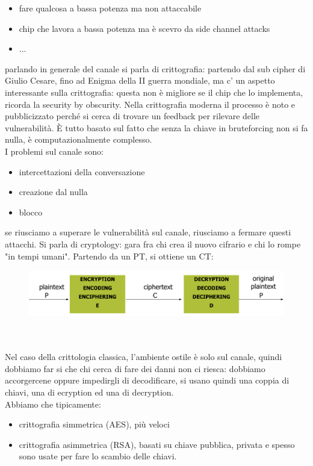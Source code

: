 \documentclass[oneside, 12pt]{extbook}
\begin{document}
\begin{itemize}
	\item fare qualcosa a bassa potenza ma non attaccabile
	\item chip che lavora a bassa potenza ma è scevro da side channel attacks
	\item ...
\end{itemize}
parlando in generale del canale si parla di crittografia: partendo dal sub cipher di Giulio Cesare, fino ad Enigma della II guerra mondiale, ma c' un aspetto interessante sulla crittografia: questa non è migliore se il chip che lo implementa, ricorda la security by obscurity. Nella crittografia moderna il processo è noto e pubblicizzato perché si cerca di trovare un feedback per rilevare delle vulnerabilità. È tutto basato sul fatto che senza la chiave in bruteforcing non si fa nulla, è computazionalmente complesso.\\I problemi sul canale sono:
\begin{itemize}
	\item intercettazioni della conversazione
	\item creazione dal nulla
	\item blocco
\end{itemize}
se riusciamo a superare le vulnerabilità sul canale, riusciamo a fermare questi attacchi. Si parla di cryptology: gara fra chi crea il nuovo cifrario e chi lo rompe "in tempi umani". Partendo da un PT, si ottiene un CT:\\
\begin{figure}[!h]
	\includegraphics[scale=.5]{immagini/hardware/crypto_scheme_base.png}
\end{figure}
\\\\Nel caso della crittologia classica, l'ambiente ostile è solo sul canale, quindi dobbiamo far si che chi cerca di fare dei danni non ci riesca: dobbiamo accorgercene oppure impedirgli di decodificare, si usano quindi una coppia di chiavi, una di ecryption ed una di decryption.
\\Abbiamo che tipicamente:
\begin{itemize}
	\item crittografia simmetrica (AES), più veloci
	\item crittografia asimmetrica (RSA), basati su chiave pubblica, privata e spesso sono usate per fare lo scambio delle chiavi.
\end{itemize}
\end{document}
